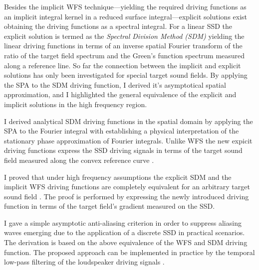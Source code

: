 \begin{thesisgroup}
Besides the implicit WFS technique---yielding the required driving functions as an implicit integral kernel in a reduced surface integral---explicit solutions exist obtaining the driving functions as a spectral integral.
For a linear SSD the explicit solution is termed as the \emph{Spectral Division Method (SDM)} yielding the linear driving functions in terms of an inverse spatial Fourier transform of the ratio of the target field spectrum and the Green's function spectrum measured along a reference line.
So far the connection between the implicit and explicit solutions has only been investigated for special target sound fields.
By applying the SPA to the SDM driving function, I derived it's asymptotical spatial approximation, and I highlighted the general equivalence of the explicit and implicit solutions in the high frequency region. \cite{Firtha2017:daga, Firtha2018:WFS_vs_SDM}
\begin{thesis}
I derived analytical SDM driving functions in the spatial domain by applying the SPA to the Fourier integral with establishing a physical interpretation of the stationary phase approximation of Fourier integrals.
Unlike WFS the new expicit driving functions express the SSD driving signals in terms of the target sound field measured along the convex reference curve \cite{Firtha2017:daga}.\end{thesis}
\begin{thesis}
I proved that under high frequency assumptions the explicit SDM and the implicit WFS driving functions are completely equivalent for an arbitrary target sound field \cite{Firtha2018:WFS_vs_SDM}.
The proof is performed by expressing the newly introduced driving function in terms of the target field's gradient measured on the SSD.
\end{thesis}
\begin{thesis}
I gave a simple asymptotic anti-aliasing criterion in order to suppress aliasing waves emerging due to the application of a discrete SSD in practical scenarios.
The derivation is based on the above equivalence of the WFS and SDM driving function.
The proposed approach can be implemented in practice by the temporal low-pass filtering of the loudspeaker driving signals \cite{Firtha2018_daga_a}.
\end{thesis}
\end{thesisgroup}

